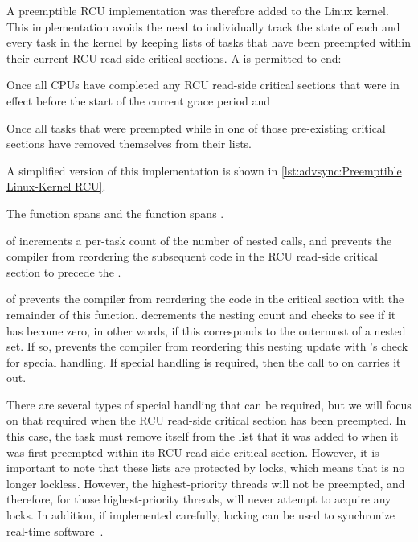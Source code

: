 A preemptible RCU implementation was therefore added to the Linux kernel.
This implementation avoids the need to individually track the state of
each and every task in the kernel by keeping lists of tasks that have
been preempted within their current RCU read-side critical sections.
A  is permitted to end:
\begin{enumerate*}[(1)]
\item Once all CPUs have completed any RCU read-side critical sections
that were in effect before the start of the current grace period and
\item Once all tasks that were preempted
while in one of those pre-existing critical sections have removed
themselves from their lists.
\end{enumerate*}
A simplified version of this implementation is shown in
\cref{lst:advsync:Preemptible Linux-Kernel RCU}.
\begin{fcvref}
The  function spans  and
the  function spans .
\end{fcvref}

\begin{fcvref}
 of  increments a per-task count of the
number of nested  calls, and
 prevents the compiler from reordering the subsequent code in the
RCU read-side critical section to precede the .
\end{fcvref}

\begin{fcvref}
 of  prevents the compiler from
reordering the code in the critical section with the remainder of
this function.
 decrements the nesting count and checks to see if it
has become zero, in other words, if this corresponds to the outermost
 of a nested set.
If so,  prevents the compiler from reordering this nesting
update with 's check for special handling.
If special handling is required, then the call to
 on  carries it out.

There are several types of special handling that can be required, but
we will focus on that required when the RCU read-side critical section
has been preempted.
In this case, the task must remove itself from the list that it was
added to when it was first preempted within its
RCU read-side critical section.
However, it is important to note that these lists are protected by locks,
which means that  is no longer lockless.
However, the highest-priority threads will not be preempted, and therefore,
for those highest-priority threads,  will never
attempt to acquire any locks.
In addition, if implemented carefully, locking can be used to synchronize
real-time software~\cite{BjoernBrandenburgPhD,DipankarSarma2004OLSscalability}.
\end{fcvref}

